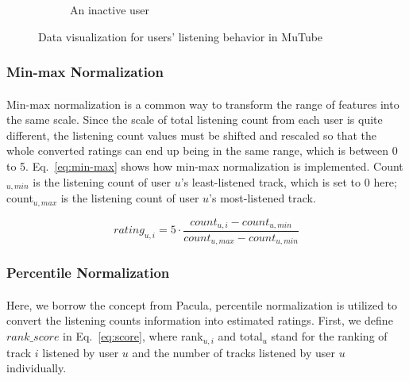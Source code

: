 \documentclass[a4paper,12pt]{report}
\begin{document}
\begin{figure}
\begin{center}
\begin{subfigure}{.78\textwidth}
            \caption{An inactive user}
            \label{fig:inact_user}
        \end{subfigure}
        \caption{Data visualization for users' listening behavior in MuTube}
        \label{fig:listen_behavior_MuTube}
    \end{center}
\end{figure}

\subsubsection{Min-max Normalization}
\paragraph{}
Min-max normalization is a common way to transform the range of features into the same scale. Since the scale of total listening count from each user is quite different, the listening count values must be shifted and rescaled so that the whole converted ratings can end up being in the same range, which is between 0 to 5. Eq.~\ref{eq:min-max} shows how min-max normalization is implemented. Count$_{u,min}$ is the listening count of user $u$'s least-listened track, which is set to 0 here; count$_{u,max}$ is the listening count of user $u$'s most-listened track.

\begin{equation}
    rating_{u,i} = 5\cdot\frac{count_{u,i}-count_{u,min}}{count_{u,max}-count_{u,min}}
    \label{eq:min-max}
\end{equation}





\subsubsection{Percentile Normalization}

\paragraph{}
Here, we borrow the concept from Pacula\cite{pacula2009matrix}, percentile normalization is utilized to convert the listening counts information into estimated ratings. First, we define $rank\_score$ in Eq.~\ref{eq:score}, where rank$_{u,i}$ and total$_{u}$ stand for the ranking of track $i$ listened by user $u$ and the number of tracks listened by user $u$ individually.
\end{document}
